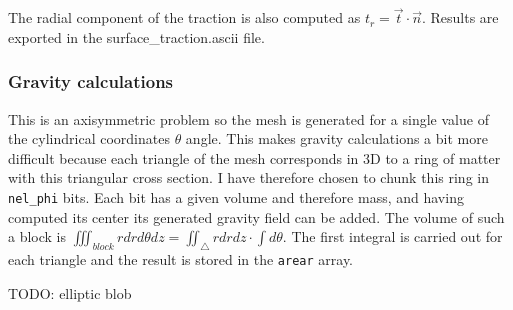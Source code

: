 The radial component of the traction is also computed as $t_r=\vec{t}\cdot \vec{n}$.
Results are exported in the {\filenamefont surface\_traction.ascii} file.


 
\subsubsection*{Gravity calculations}

This is an axisymmetric problem so the mesh is generated for a single value of the cylindrical 
coordinates $\theta$ angle. 
This makes gravity calculations a bit more difficult because each triangle of the mesh corresponds
in 3D to a ring of matter with this triangular cross section. 
I have therefore chosen to chunk this ring in {\tt nel\_phi} bits. Each bit has a given volume and therefore
mass, and having computed its center its generated gravity field can be added. 
The volume of such a block is $\iiint_{block} r dr d\theta dz =\iint_\triangle rdrdz \cdot \int d\theta$.  
The first integral is carried out for each triangle and the result is stored in the {\tt arear} array. 







TODO: elliptic blob

